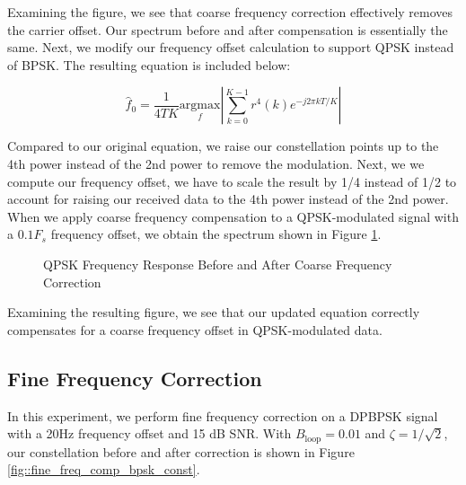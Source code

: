 \documentclass{article}
\begin{document}
\noindent Examining the figure, we see that coarse frequency correction effectively removes the carrier offset. Our spectrum before and after compensation is essentially the same. Next, we modify our frequency offset calculation to support QPSK instead of BPSK. The resulting equation is included below:

\begin{equation}
	\hat{f}_0 = \frac{1}{4TK}\underset{f}{\text{argmax}}\left\vert\sum_{k=0}^{K-1}{r^4(k)e^{-j2{\pi}kT/K}}\right\vert
\end{equation}

\noindent Compared to our original equation, we raise our constellation points up to the 4th power instead of the 2nd power to remove the modulation. Next, we we compute our frequency offset, we have to scale the result by 1/4 instead of 1/2 to account for raising our received data to the 4th power instead of the 2nd power. When we apply coarse frequency compensation to a QPSK-modulated signal with a $0.1F_s$ frequency offset, we obtain the spectrum shown in Figure \ref{fig::psd_qpsk_with_cfc}.
 
\begin{figure}[H]
	\centerline{}
	\caption{QPSK Frequency Response Before and After Coarse Frequency Correction}
	\label{fig::psd_qpsk_with_cfc}
\end{figure}

\noindent Examining the resulting figure, we see that our updated equation correctly compensates for a coarse frequency offset in QPSK-modulated data.

\subsection{Fine Frequency Correction}

In this experiment, we perform fine frequency correction on a DPBPSK signal with a 20Hz frequency offset and 15 dB SNR. With $B_\text{loop} = 0.01$ and $\zeta = 1/\sqrt{2}$, our constellation before and after correction is shown in Figure \ref{fig::fine_freq_comp_bpsk_const}.
\end{document}
